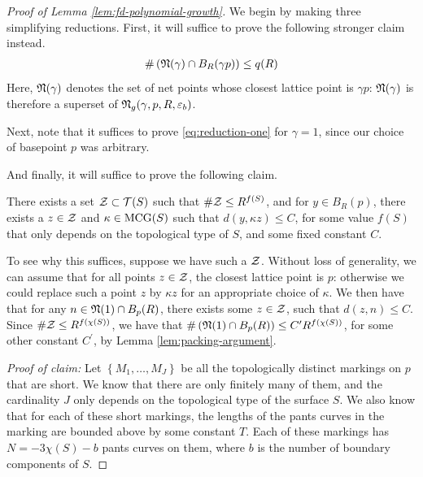 \documentclass[12pt, reqno]{amsart}
\begin{document}
\begin{proof}[Proof of Lemma \ref{lem:fd-polynomial-growth}]
  We begin by making three simplifying reductions.
  First, it will suffice to prove the following stronger claim instead.
  \begin{align}
    \label{eq:reduction-one}
    \#\left( \mathfrak{N}(\gamma) \cap B_R(\gamma p) \right) \leq q(R)
  \end{align}
  Here, $\mathfrak{N}(\gamma)$ denotes the set of net points whose closest lattice point is $\gamma p$: $\mathfrak{N}(\gamma)$ is therefore a superset of $\mathfrak{N}_g(\gamma, p, R, \varepsilon_b)$.

  Next, note that it suffices to prove \eqref{eq:reduction-one} for $\gamma = 1$, since our choice of basepoint $p$ was arbitrary.

  And finally, it will suffice to prove the following claim.
  \begin{claim*}
  There exists a set $\mathcal{Z} \subset \mathcal{T}(S)$ such that $\# \mathcal{Z} \leq R^{f(S)}$, and for $y \in B_R(p)$, there exists a $z \in \mathcal{Z}$ and $\kappa \in \mathrm{MCG}(S)$ such that $d(y, \kappa z) \leq C$, for some value $f(S)$ that only depends on the topological type of $S$, and some fixed constant $C$.
  \end{claim*}
  To see why this suffices, suppose we have such a $\mathcal{Z}$.
  Without loss of generality, we can assume that for all points $z \in \mathcal{Z}$, the closest lattice point is $p$: otherwise we could replace such a point $z$ by $\kappa z$ for an appropriate choice of $\kappa$.
We then have that for any $n \in \mathfrak{N}(1) \cap B_p(R)$, there exists some $z \in \mathcal{Z}$, such that $d(z, n) \leq C$.
Since $\# \mathcal{Z} \leq R^{f(\chi(S))}$, we have that $\#\left( \mathfrak{N}(1) \cap B_p(R) \right) \leq C^{\prime} R^{f(\chi(S))}$, for some other constant $C^{\prime}$, by Lemma \ref{lem:packing-argument}.

\emph{Proof of claim:}
  Let $\left\{ M_1, \ldots, M_J \right\}$ be all the topologically distinct markings on $p$ that are short.
  We know that there are only finitely many of them, and the cardinality $J$ only depends on the topological type of the surface $S$.
  We also know that for each of these short markings, the lengths of the pants curves in the marking are bounded above by some constant $T$.
  Each of these markings has $N = -3 \chi(S) - b$ pants curves on them, where $b$ is the number of boundary components of $S$.


\end{proof}
\end{document}
